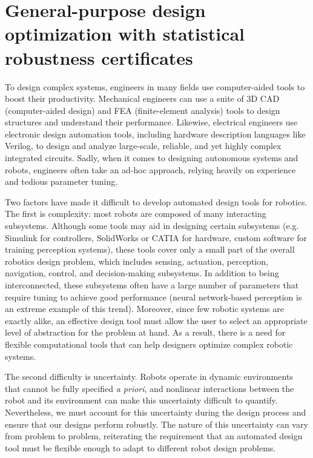\chapter{General-purpose design optimization with statistical robustness certificates}\label{ch:rss}

To design complex systems, engineers in many fields use computer-aided tools to boost their productivity. Mechanical engineers can use a suite of 3D CAD (computer-aided design) and FEA (finite-element analysis) tools to design structures and understand their performance. Likewise, electrical engineers use electronic design automation tools, including hardware description languages like Verilog, to design and analyze large-scale, reliable, and yet highly complex integrated circuits. Sadly, when it comes to designing autonomous systems and robots, engineers often take an ad-hoc approach, relying heavily on experience and tedious parameter tuning.

Two factors have made it difficult to develop automated design tools for robotics. The first is complexity: most robots are composed of many interacting subsystems. Although some tools may aid in designing certain subsystems (e.g. Simulink for controllers, SolidWorks or CATIA for hardware, custom software for training perception systems), these tools cover only a small part of the overall robotics design problem, which includes sensing, actuation, perception, navigation, control, and decision-making subsystems. In addition to being interconnected, these subsystems often have a large number of parameters that require tuning to achieve good performance (neural network-based perception is an extreme example of this trend). Moreover, since few robotic systems are exactly alike, an effective design tool must allow the user to select an appropriate level of abstraction for the problem at hand. As a result, there is a need for flexible computational tools that can help designers optimize complex robotic systems.

The second difficulty is uncertainty. Robots operate in dynamic environments that cannot be fully specified \textit{a priori}, and nonlinear interactions between the robot and its environment can make this uncertainty difficult to quantify. Nevertheless, we must account for this uncertainty during the design process and ensure that our designs perform robustly. The nature of this uncertainty can vary from problem to problem, reiterating the requirement that an automated design tool must be flexible enough to adapt to different robot design problems.

